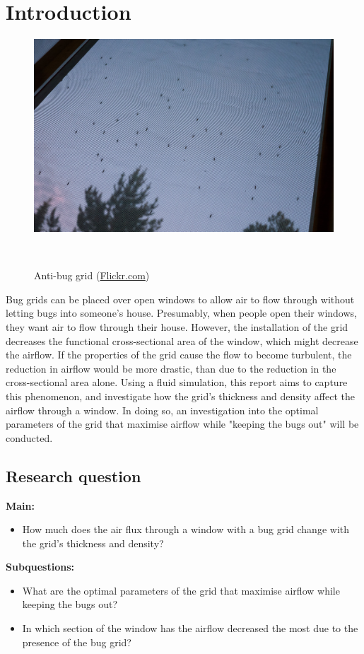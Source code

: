 \section{Introduction} \label{section: intro and motiv}

\begin{figure}
\vspace{-1.5cm}
\includegraphics[width=0.9\linewidth]{figures/mosquitogrid.jpg}
\caption{Anti-bug grid (\href{https://www.flickr.com/photos/neekohfi/7817306994/}{Flickr.com})}\
\end{figure}

Bug grids can be placed over open windows to allow air to flow through without letting bugs into someone's house. Presumably, when people open their windows, they want air to flow through their house. However, the installation of the grid decreases the functional cross-sectional area of the window, which might decrease the airflow. If the properties of the grid cause the flow to become turbulent, the reduction in airflow would be more drastic, than due to the reduction in the cross-sectional area alone. Using a fluid simulation, this report aims to capture this phenomenon, and investigate how the grid's thickness and density affect the airflow through a window. In doing so, an investigation into the optimal parameters of the grid that maximise airflow while "keeping the bugs out" will be conducted. 


\subsection{Research question}
\textbf{Main:}
\begin{itemize}
    \item How much does the air flux through a window with a bug grid change with the grid's thickness and density?
\end{itemize}
\textbf{Subquestions:}
\begin{itemize}
    \item What are the optimal parameters of the grid that maximise airflow while keeping the bugs out?
    \item In which section of the window has the airflow decreased the most due to the presence of the bug grid?
\end{itemize}
